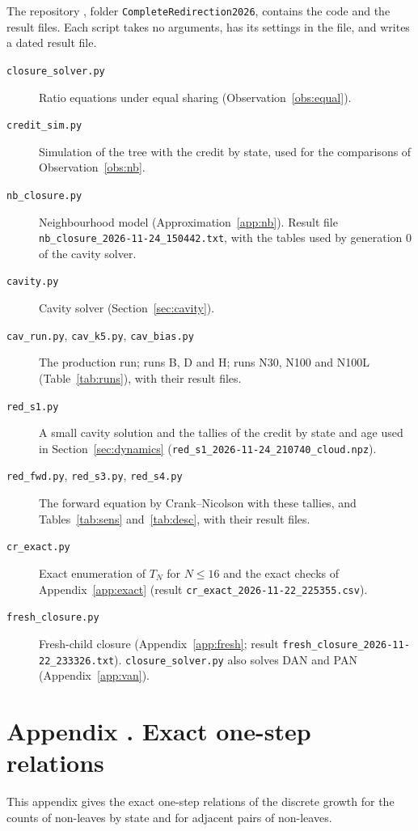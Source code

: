 \documentclass[11pt]{article}
\theoremstyle{plain}
\theoremstyle{definition}
\theoremstyle{remark}
\begin{document}
The repository \cite{Repo}, folder \texttt{CompleteRedirection2026}, contains the code and the result files. Each script takes no arguments, has its settings in the file, and writes a dated result file.
{\raggedright
\begin{description}
\item[\texttt{closure\_solver.py}] Ratio equations under equal sharing (Observation~\ref{obs:equal}).
\item[\texttt{credit\_sim.py}] Simulation of the tree with the credit by state, used for the comparisons of Observation~\ref{obs:nb}.
\item[\texttt{nb\_closure.py}] Neighbourhood model (Approximation~\ref{app:nb}). Result file \texttt{nb\_closure\_2026-11-24\_150442.txt}, with the tables used by generation $0$ of the cavity solver.
\item[\texttt{cavity.py}] Cavity solver (Section~\ref{sec:cavity}).
\item[\texttt{cav\_run.py}, \texttt{cav\_k5.py}, \texttt{cav\_bias.py}] The production run; runs B, D and H; runs N30, N100 and N100L (Table~\ref{tab:runs}), with their result files.
\item[\texttt{red\_s1.py}] A small cavity solution and the tallies of the credit by state and age used in Section~\ref{sec:dynamics} (\texttt{red\_s1\_2026-11-24\_210740\_cloud.npz}).
\item[\texttt{red\_fwd.py}, \texttt{red\_s3.py}, \texttt{red\_s4.py}] The forward equation by Crank--Nicolson with these tallies, and Tables~\ref{tab:sens} and~\ref{tab:desc}, with their result files.
\item[\texttt{cr\_exact.py}] Exact enumeration of $T_N$ for $N\le16$ and the exact checks of Appendix~\ref{app:exact} (result \texttt{cr\_exact\_2026-11-22\_225355.csv}).
\item[\texttt{fresh\_closure.py}] Fresh-child closure (Appendix~\ref{app:fresh}; result \texttt{fresh\_closure\_2026-11-22\_233326.txt}). \texttt{closure\_solver.py} also solves DAN and PAN (Appendix~\ref{app:van}).
\end{description}
}

\section*{Appendix \thesection. Exact one-step relations}\label{app:exact}

This appendix gives the exact one-step relations of the discrete growth for the counts of non-leaves by state and for adjacent pairs of non-leaves.
\end{document}
